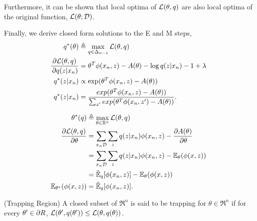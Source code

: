 \documentclass[tablecaption=bottom]{jmlr}
\begin{document}
Furthermore, it can be shown that local optima of $\mathcal{L}(\theta, q)$ are
also local optima of the original function, $\mathcal{L}(\theta ; \mathcal{D})$.

Finally, we derive closed form solutions to the E and M steps,
\begin{align}
  q^*(\theta) 
    &\triangleq \max_{q \in \Delta_{n-1}} \mathcal{L}(\theta,q)\\
  \frac{\partial \mathcal{L}(\theta,q)}{\, \partial q(z|x_n)} 
    &= \theta^T \phi(x_n,z) - A(\theta) - \log q(z|x_n) - 1 + \lambda \\
  q^*(z|x_n) &\propto \exp(\theta^T \phi(x_n,z) - A(\theta)) \\
  q^*(z|x_n) &= \frac{exp(\theta^T \phi(x_n,z) - A(\theta))}{\sum_{z'} exp(\theta^T \phi(x_n,z') - A(\theta))}.
\end{align}

\begin{align}
  \theta^*(q)
    &\triangleq \max_{\theta \in \mathbb{R}^{n}} \mathcal{L}(\theta,q)\\
  \frac{\partial \mathcal{L}(\theta,q)}{\, \partial \theta} 
  &= \sum_{x_n \mathcal{D}}\sum_{z} q(z|x_n) \phi(x_n,z) - \frac{\partial A(\theta)}{\, \partial \theta} \\
  &= \sum_{x_n \mathcal{D}}\sum_{z} q(z|x_n) \phi(x_n,z) - \operatorname{\mathbb{E}}_{\theta}(\phi(x,z)) \\
  &= \hat{\operatorname{\mathbb{E}}}_{q}[\phi(x_n,z)] - \operatorname{\mathbb{E}}_{\theta}(\phi(x,z)) \\
  \operatorname{\mathbb{E}}_{\theta^*}(\phi(x,z)) &= \hat{\operatorname{\mathbb{E}}}_{q}[\phi(x_n,z)].
\end{align}

\begin{definition}(Trapping Region)
  A closed subset of $\Re^n$ is said to be trapping for $\theta \in
  \Re^n$ if for every $\theta' \in \partial R$, $\mathcal{L}(\theta',
  q(\theta')) \le \mathcal{L}( \theta, q(\theta) )$.
\end{definition}
\end{document}
